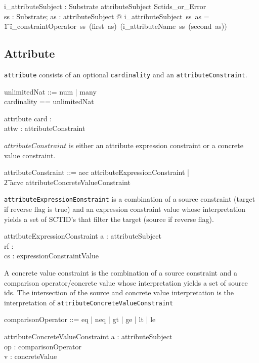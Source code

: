 \documentclass{article}
\def\spec#1{{\tt #1}}
\begin{document}
\begin{gendef}
   i\_attributeSubject : Substrate \pfun attributeSubject \pfun Sctids\_or\_Error \\
\where
   \forall ss : Substrate; as : attributeSubject @ i\_attributeSubject~ss~as = \\
\t1 i\_constraintOperator~ss~(first~as)~(i\_attributeName~ss~(second~as)) \\
\end{gendef}
\subsection{Attribute}
\spec{attribute} consists of an optional \spec{cardinality} and an \spec{attributeConstraint}.
\begin{zed}
unlimitedNat ::= num \ldata \nat \rdata | many \\
cardinality == \nat \cross unlimitedNat \\
\end{zed}
\begin{schema}{attribute}
   card : \optional[cardinality] \\
   attw : attributeConstraint
\end{schema}

$attributeConstraint$ is either an attribute expression constraint or a concrete value constraint.
\begin{zed}
attributeConstraint ::= aec \ldata attributeExpressionConstraint \rdata | \\
\t2 acvc \ldata attributeConcreteValueConstraint \rdata \\
\end{zed}

\spec{attributeExpressionEonstraint} is a combination of a source constraint (target if reverse flag is true) and an
expression constraint value whose interpretation yields a set of SCTID's that filter the target (source if reverse flag).
\begin{zed}
[reverseFlag] 
\end{zed}
\begin{schema}{attributeExpressionConstraint}
   a : attributeSubject \\
   rf : \optional[reverseFlag] \\
   cs : expressionConstraintValue
\end{schema}

A concrete value constraint is the combination of a source constraint and a comparison operator/concrete value 
whose interpretation yields a set of source ids.  The intersection of the source and concrete value interpretation
is the interpretation of \spec{attributeConcreteValueConstraint}
\begin{zed}
comparisonOperator ::= eq | neq | gt | ge | lt | le 
\end{zed}
\begin{schema}{attributeConcreteValueConstraint}
   a : attributeSubject \\
   op : comparisonOperator \\
   v : concreteValue
\end{schema}
\end{document}

